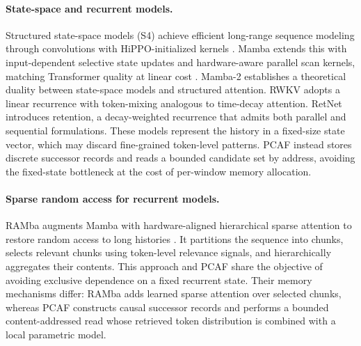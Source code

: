 \documentclass[11pt]{article}
\begin{document}
\paragraph{State-space and recurrent models.}
Structured state-space models (S4) achieve efficient long-range sequence
modeling through convolutions with HiPPO-initialized kernels
\citep{gu2021s4}. Mamba extends this with input-dependent selective state
updates and hardware-aware parallel scan kernels, matching Transformer quality
at linear cost \citep{gu2023mamba}. Mamba-2 \citep{dao2024mamba2} establishes
a theoretical duality between state-space models and structured attention.
RWKV \citep{peng2023rwkv} adopts a linear recurrence with token-mixing
analogous to time-decay attention. RetNet \citep{sun2023retnet} introduces
retention, a decay-weighted recurrence that admits both parallel and sequential
formulations. These models represent the history in a fixed-size state vector,
which may discard fine-grained token-level patterns. PCAF instead stores
discrete successor records and reads a bounded candidate set by address,
avoiding the fixed-state bottleneck at the cost of per-window memory
allocation.

\paragraph{Sparse random access for recurrent models.}
RAMba augments Mamba with hardware-aligned hierarchical sparse attention to
restore random access to long histories \citep{hu2025ramba}. It partitions the
sequence into chunks, selects relevant chunks using token-level relevance
signals, and hierarchically aggregates their contents. This approach and PCAF
share the objective of avoiding exclusive dependence on a fixed recurrent
state. Their memory mechanisms differ: RAMba adds learned sparse attention over
selected chunks, whereas PCAF constructs causal successor records and performs
a bounded content-addressed read whose retrieved token distribution is combined
with a local parametric model.
\end{document}

